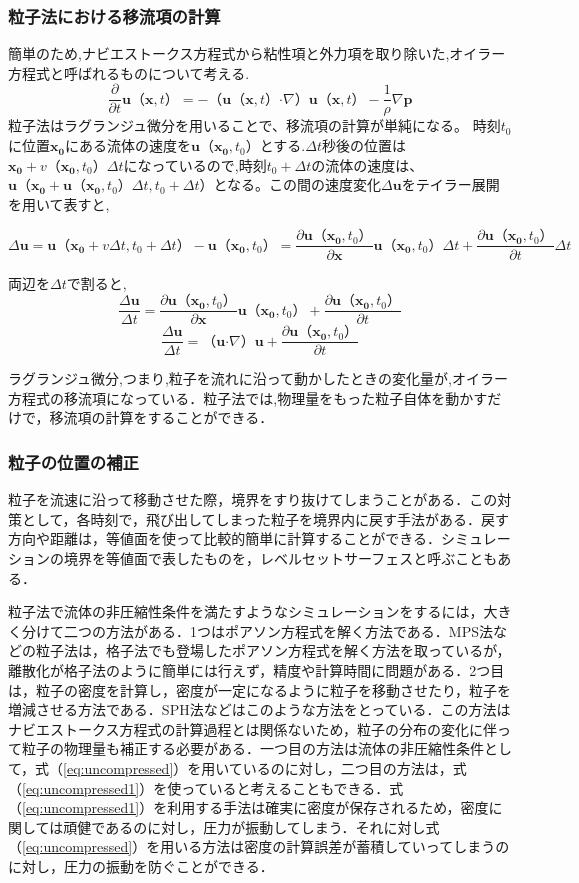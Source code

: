 \documentclass[a4j,12pt]{jreport}
\begin{document}
\subsubsection{粒子法における移流項の計算} \label{subsec:particleadvect}
簡単のため,ナビエストークス方程式から粘性項と外力項を取り除いた,オイラー方程式と呼ばれるものについて考える.
$$\frac{\partial}{\partial t}\bm{u}（\bm{x},t） = -（\bm{u}（\bm{x},t）\boldsymbol{\cdot}\nabla）\bm{u}（\bm{x},t） - \frac{1}{\rho}\nabla \bm{p}$$
粒子法はラグランジュ微分を用いることで、移流項の計算が単純になる。
時刻$t_0$に位置$\bm{x_0}$にある流体の速度を$\bm{u}（\bm{x_0},t_0）$とする.$\varDelta t$秒後の位置は$\bm{x_0}+v（\bm{x_0},t_0）\varDelta t$になっているので,時刻$t_0+\varDelta t$の流体の速度は、$\bm{u}（\bm{x_0}+\bm{u}（\bm{x_0},t_0）\varDelta t,t_0+\varDelta t）$となる。この間の速度変化$\varDelta \bm{u}$をテイラー展開を用いて表すと,

$$ \varDelta \bm{u} = \bm{u}（\bm{x_0}+v\varDelta t,t_0+\varDelta t） - \bm{u}（\bm{x_0},t_0） = \frac{\partial \bm{u}（\bm{x_0},t_0）}{\partial \bm{x}}\bm{u}（\bm{x_0},t_0）\varDelta t + \frac{\partial \bm{u}（\bm{x_0},t_0）}{\partial t}\varDelta t$$

両辺を$\varDelta t$で割ると,
$$ \frac{\varDelta \bm{u}}{\varDelta t} = \frac{\partial \bm{u}（\bm{x_0},t_0）}{\partial \bm{x}}\bm{u}（\bm{x_0},t_0） + \frac{\partial \bm{u}（\bm{x_0},t_0）}{\partial t}$$
$$ \frac{\varDelta \bm{u}}{\varDelta t} = （\bm{u}\boldsymbol{\cdot}\nabla）\bm{u} + \frac{\partial \bm{u}（\bm{x_0},t_0）}{\partial t}$$

ラグランジュ微分,つまり,粒子を流れに沿って動かしたときの変化量が,オイラー方程式の移流項になっている．粒子法では,物理量をもった粒子自体を動かすだけで，移流項の計算をすることができる．

\subsubsection{粒子の位置の補正} \label{subsec:fixparticlepos}
粒子を流速に沿って移動させた際，境界をすり抜けてしまうことがある．この対策として，各時刻で，飛び出してしまった粒子を境界内に戻す手法がある．戻す方向や距離は，等値面を使って比較的簡単に計算することができる．シミュレーションの境界を等値面で表したものを，レベルセットサーフェスと呼ぶこともある．

粒子法で流体の非圧縮性条件を満たすようなシミュレーションをするには，大きく分けて二つの方法がある．1つはポアソン方程式を解く方法である．MPS法などの粒子法は，格子法でも登場したポアソン方程式を解く方法を取っているが，離散化が格子法のように簡単には行えず，精度や計算時間に問題がある．2つ目は，粒子の密度を計算し，密度が一定になるように粒子を移動させたり，粒子を増減させる方法である．SPH法などはこのような方法をとっている．この方法はナビエストークス方程式の計算過程とは関係ないため，粒子の分布の変化に伴って粒子の物理量も補正する必要がある．一つ目の方法は流体の非圧縮性条件として，式（\ref{eq:uncompressed}）を用いているのに対し，二つ目の方法は，式（\ref{eq:uncompressed1}）を使っていると考えることもできる．式（\ref{eq:uncompressed1}）を利用する手法は確実に密度が保存されるため，密度に関しては頑健であるのに対し，圧力が振動してしまう．それに対し式（\ref{eq:uncompressed}）を用いる方法は密度の計算誤差が蓄積していってしまうのに対し，圧力の振動を防ぐことができる．
\end{document}
